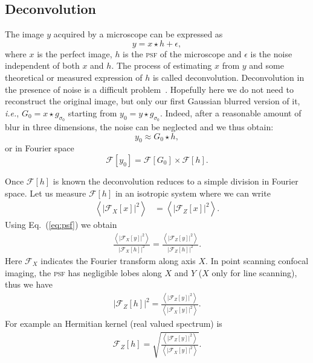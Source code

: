 \documentclass[8.5pt,twoside,twocolumn]{article}
\begin{document}
\subsection{Deconvolution}
The image $y$ acquired by a microscope can be expressed as 
\begin{equation}
y = x \star h + \epsilon,
\label{eq:psf}
\end{equation}
where $x$ is the perfect image, $h$ is the \textsc{psf} of the microscope and $\epsilon$ is the noise independent of both $x$ and $h$. The process of estimating $x$ from $y$ and some theoretical or measured expression of $h$ is called deconvolution. Deconvolution in the presence of noise is a difficult problem~\cite{Riad1986}. Hopefully here we do not need to reconstruct the original image, but only our first Gaussian blurred version of it, \emph{i.e.}, $G_0 = x \star g_{\sigma_0}$ starting from $y_0 = y \star g_{\sigma_0}$. Indeed, after a reasonable amount of blur in three dimensions, the noise can be neglected and we thus obtain:
\begin{equation}
y_0 \approx G_0 \star h,
\end{equation}
or in Fourier space
\begin{equation}
\mathcal{F}[y_0] = \mathcal{F}[G_0] \times \mathcal{F}[h]. 
\label{eq:Fourier_conv}
\end{equation}

Once $\mathcal{F}[h]$ is known the deconvolution reduces to a simple division in Fourier space. Let us measure $\mathcal{F}[h]$ in an isotropic system where we can write
\begin{eqnarray}
\left\langle \left|\mathcal{F}_X[x]\right|^2 \right\rangle  &= \left\langle \left|\mathcal{F}_Z[x]\right|^2 \right\rangle. 
\end{eqnarray}
Using Eq.~(\ref{eq:psf}) we obtain 
\begin{eqnarray}
\frac{\left\langle\left|\mathcal{F}_X[y]\right|^2 \right\rangle}{\left|\mathcal{F}_X[h]\right|^2}  = \frac{\left\langle \left|\mathcal{F}_Z[y]\right|^2\right\rangle}{\left|\mathcal{F}_Z[h]\right|^2}. 
\end{eqnarray}
Here $\mathcal{F}_X$ indicates the Fourier transform along axis $X$. In point scanning confocal imaging, the \textsc{psf} has negligible lobes along $X$ and $Y$ ($X$ only for line scanning), thus we have 
\begin{eqnarray}
\left|\mathcal{F}_Z[h]\right|^2 = \frac{\left\langle \left|\mathcal{F}_Z[y]\right|^2\right\rangle}{\left\langle\left|\mathcal{F}_X[y]\right|^2 \right\rangle}.
\end{eqnarray}
For example an Hermitian kernel (real valued spectrum) is 
\begin{eqnarray}
\mathcal{F}_Z[h] = \sqrt{\frac{\left\langle \left|\mathcal{F}_Z[y]\right|^2\right\rangle}{\left\langle\left|\mathcal{F}_X[y]\right|^2 \right\rangle}}.
\end{eqnarray}
\end{document}
